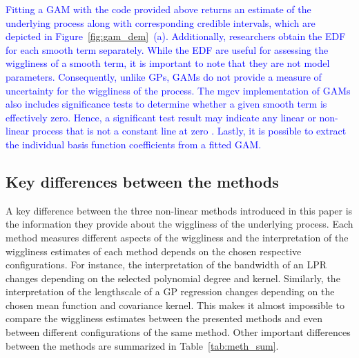 \documentclass[man, floatsintext]{apa7}
\begin{document}
\textcolor{blue}{
  Fitting a GAM with the code provided above returns an estimate of the
  underlying process along with corresponding credible intervals, which are
  depicted in Figure~\ref{fig:gam_dem}~(a). Additionally, researchers obtain
  the EDF for each smooth term separately. While the EDF are useful for
  assessing the wiggliness of a smooth term, it is important to note that they
  are not model parameters. Consequently, unlike GPs, GAMs do not provide a
  measure of uncertainty for the wiggliness of the process. The mgcv
  implementation of GAMs also includes significance tests to determine whether
  a given smooth term is effectively zero. Hence, a significant test result
  may indicate any linear or non-linear process that is not a constant line at
  zero \parencite{wood_p-values_2013,bringmann_changing_2017}. Lastly, it is
  possible to extract the individual basis function coefficients from a fitted
  GAM.}

\subsection{Key differences between the methods}

A key difference between the three non-linear methods introduced in this paper
is the information they provide about the wiggliness of the underlying process.
Each method measures different aspects of the wiggliness and the interpretation
of the wiggliness estimates of each method depends on the chosen respective
configurations. For instance, the interpretation of the bandwidth of an LPR
changes depending on the selected polynomial degree and kernel. Similarly, the
interpretation of the lengthscale of a GP regression changes depending on the
chosen mean function and covariance kernel. This makes it almost impossible to
compare the wiggliness estimates between the presented methods and even between
different configurations of the same method. Other important differences
between the methods are summarized in Table~\ref{tab:meth_sum}.
\end{document}

